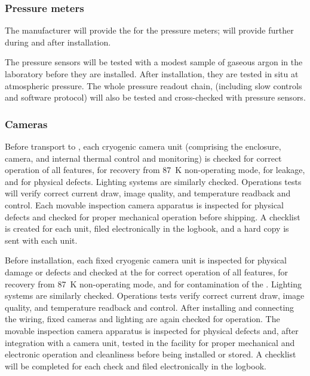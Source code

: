 \subsubsection{Pressure meters}
\label{sec:fdgen-slow-cryo-qc-press}
 The manufacturer will provide the  for the pressure meters;  will provide further  during and after installation.

The pressure sensors will be tested with a modest sample of gaseous argon in the laboratory before they are installed. After installation, they are tested in situ at atmospheric pressure. The whole pressure readout chain, (including slow controls  and software protocol) 
will also be tested and cross-checked with  pressure sensors.

\subsubsection{Cameras}
\label{sec:fdgen-slow-cryo-qc-c}

Before %
transport to \surf, each cryogenic camera unit (comprising the enclosure, camera, and internal thermal control and monitoring) %
is checked for correct operation of all features, for recovery from \SI{87}{K} non-operating mode, for leakage, and for physical defects. Lighting systems %
are similarly checked. Operations tests will verify correct current draw, image quality, and temperature readback and control. Each movable inspection camera apparatus %
is inspected for physical defects and checked for proper mechanical operation before shipping. A checklist %
is created for each unit, filed electronically in the  logbook, and a hard copy is sent with each unit. 

Before installation, each fixed cryogenic camera unit is inspected for physical damage or defects and checked at the  
for correct operation of all features, for recovery from \SI{87}{K} non-operating mode, and for contamination of the . Lighting systems are similarly checked. Operations tests verify correct current draw, image quality, and temperature readback and control. After installing and connecting the wiring, fixed cameras and lighting are again  checked for operation. The movable inspection camera apparatus is inspected for physical defects and, after integration with a camera unit, tested in the facility for proper mechanical and electronic operation and cleanliness before being installed or stored. A checklist will be completed for each  check and filed electronically in the  logbook. 

